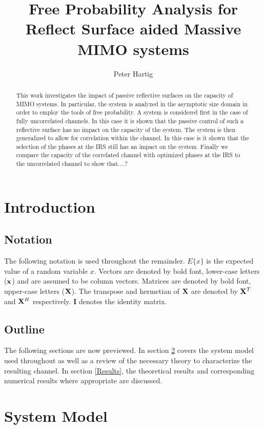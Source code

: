 \documentclass[12pt,a4paper]{report}
\title{Free Probability Analysis for Reflect Surface aided Massive MIMO systems}
\author{Peter Hartig}
\begin{document}
\maketitle
\begin{abstract}
This work investigates the impact of passive reflective surfaces on the capacity of MIMO systems. In particular, the system is analyzed in the asymptotic size domain in order to employ the tools of free probability. A system is considered first in the case of fully uncorrelated channels. In this case it is shown that the passive control of such a reflective surface has no impact on the capacity of the system. The system is then generalized to allow for correlation within the channel. In this case is it shown that the selection of the phases at the IRS still has an impact on the system. Finally we compare the capacity of the correlated channel with optimized phases at the IRS to the uncorrelated channel to show that....?
\end{abstract}
%
\tableofcontents


\chapter{Introduction}



\section{Notation}
The following notation is used throughout the remainder. 
$E\{x\}$ is the expected value of a random variable $x$.
Vectors are denoted by bold font, lower-case letters ($\mathbf{x}$) and are assumed to be column vectors.
Matrices are denoted by bold font, upper-case letters ($\mathbf{X}$). The transpose and hermetian of $\mathbf{X}$ are denoted by $\mathbf{X}^T$ and $\mathbf{X}^H$ respectively.
$\mathbf{I}$ denotes the identity matrix.

\section{Outline}
The following sections are now previewed. In section \ref{system_model} covers the system model used throughout as well as a review of the necessary theory to characterize the resulting channel. In section \ref{Results}, the theoretical results and corresponding numerical results where appropriate are discussed. 
\chapter{System Model}\label{system_model}
\end{document}
